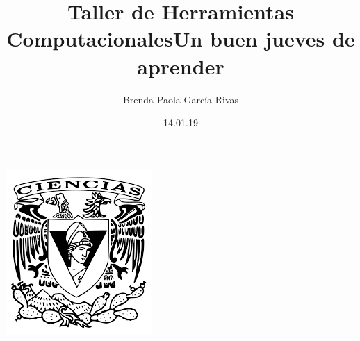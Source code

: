 \documentclass[letterpaper,12pt, oneside]{article}
\title{\huge\color{orange}Taller de Herramientas Computacionales}
\author{Brenda Paola García Rivas}
\date{14.01.19}
\begin{document}
		\maketitle
		\begin{center}
			\includegraphics[scale=0.98]{1.png}
		\end{center}
		\newpage
		\title{\huge Un buen jueves de aprender\\}
	
\end{document}
